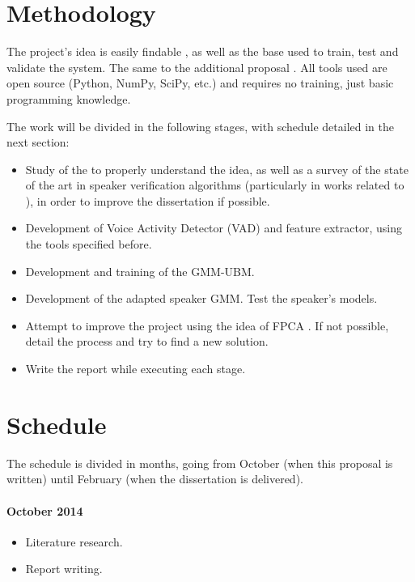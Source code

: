 \documentclass[a4paper,twocolumn]{article}
\begin{document}
\section{Methodology}
\label{ch:methodology}

The project's idea is easily findable \cite{reynolds_et_al_2000}, as well as the base used \cite{corpus_paper} to train, test and validate the system. The same to the additional proposal \cite{gao_et_al_2013}. All tools used are open source (Python, NumPy, SciPy, etc.) and requires no training, just basic programming knowledge.

The work will be divided in the following stages, with schedule detailed in the next section:

\begin{itemize}[noitemsep]
    \item Study of the \cite{reynolds_et_al_2000} to properly understand the idea, as well as a survey of the state of the art in speaker verification algorithms (particularly in works related to \cite{reynolds_et_al_2000}), in order to improve the dissertation if possible.
    \item Development of Voice Activity Detector (VAD) and feature extractor, using the tools specified before.
    \item Development and training of the GMM-UBM.
    \item Development of the adapted speaker GMM. Test the speaker's models.
    \item Attempt to improve the project using the idea of FPCA \cite{gao_et_al_2013}. If not possible, detail the process and try to find a new solution.
    \item Write the report while executing each stage.
\end{itemize}


\section{Schedule}
\label{ch:schedule}

The schedule is divided in months, going from October (when this proposal is written) until February (when the dissertation is delivered).

\paragraph{\textbf{October 2014}}
\begin{itemize}[noitemsep]
    \item Literature research.
    \item Report writing.
\end{itemize}
\end{document}
